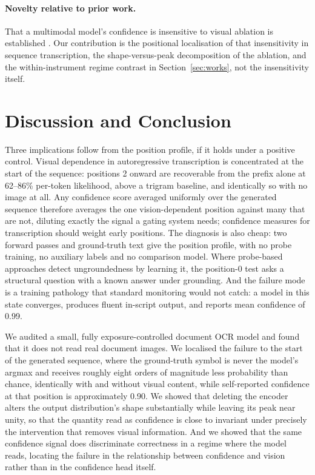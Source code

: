 \documentclass{article}
\begin{document}
\paragraph{Novelty relative to prior work.} That a multimodal model's confidence is insensitive
to visual ablation is established \citep{khanmohammadi2026bicr}. Our contribution is the
positional localisation of that insensitivity in sequence transcription, the
shape-versus-peak decomposition of the ablation, and the within-instrument regime contrast in
Section~\ref{sec:works}, not the insensitivity itself.

\section{Discussion and Conclusion}

Three implications follow from the position profile, if it holds under a positive control.
Visual dependence in autoregressive transcription is concentrated at the start of the
sequence: positions 2 onward are recoverable from the prefix alone at 62--86\% per-token
likelihood, above a trigram baseline, and identically so with no image at all. Any confidence
score averaged uniformly over the generated sequence therefore averages the one
vision-dependent position against many that are not, diluting exactly the signal a gating
system needs; confidence measures for transcription should weight early positions. The
diagnosis is also cheap: two forward passes and ground-truth text give the position profile,
with no probe training, no auxiliary labels and no comparison model. Where probe-based
approaches \citep{khanmohammadi2026bicr,readingbetweenlines2025,kogilathota2026halp} detect
ungroundedness by learning it, the position-0 test asks a structural question with a known
answer under grounding. And the failure mode is a training pathology that standard monitoring
would not catch: a model in this state converges, produces fluent in-script output, and
reports mean confidence of 0.99.

We audited a small, fully exposure-controlled document OCR model and found that it does not
read real document images. We localised the failure to the start of the generated sequence,
where the ground-truth symbol is never the model's argmax and receives roughly eight orders of
magnitude less probability than chance, identically with and without visual content, while
self-reported confidence at that position is approximately 0.90. We showed that deleting the
encoder alters the output distribution's shape substantially while leaving its peak near
unity, so that the quantity read as confidence is close to invariant under precisely the
intervention that removes visual information. And we showed that the same confidence signal
does discriminate correctness in a regime where the model reads, locating the failure in the
relationship between confidence and vision rather than in the confidence head itself.
\end{document}
